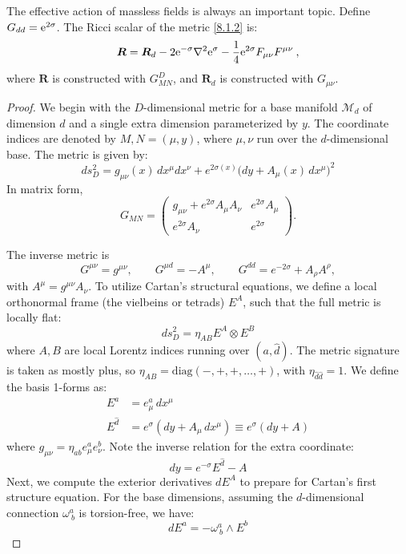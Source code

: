 The effective action of massless fields is always an important topic. Define $G_{d d}=\mathrm{e}^{2 \sigma}$. The Ricci scalar of the metric \eqref{8.1.2} is:
\begin{equation}
	\bm{R}=\bm{R}_{d}-2 \mathrm{e}^{-\sigma} \nabla^{2} \mathrm{e}^{\sigma}-\frac{1}{4} \mathrm{e}^{2 \sigma} F_{\mu \nu} F^{\mu \nu} \:, \label{8.1.8}
\end{equation}
where $\bm{R}$ is constructed with $G_{M N}^{D}$, and $\bm{R}_{d}$ is constructed with $G_{\mu \nu} $.
\begin{tcolorbox}[breakable]
	\begin{proof}
			We begin with the $D$-dimensional metric for a base manifold $\mathcal{M}_d$ of dimension $d$ and a single extra dimension parameterized by $y$. The coordinate indices are denoted by $M, N = (\mu, y)$, where $\mu, \nu$ run over the $d$-dimensional base. The metric is given by:
			\begin{equation}
				ds_D^2 = g_{\mu\nu}(x) \, dx^\mu dx^\nu + e^{2\sigma(x)} \big( dy + A_\mu(x) \, dx^\mu \big)^2
			\end{equation}
			In matrix form,
			\[
			G_{MN} = \begin{pmatrix}
				g_{\mu\nu} + e^{2\sigma} A_\mu A_\nu & e^{2\sigma} A_\mu \\
				e^{2\sigma} A_\nu & e^{2\sigma}
			\end{pmatrix}.
			\]
			
			The inverse metric is
			\[
			G^{\mu\nu} = g^{\mu\nu}, \qquad
			G^{\mu d} = -A^\mu, \qquad
			G^{dd} = e^{-2\sigma} + A_\rho A^\rho,
			\]
			with $A^\mu = g^{\mu\nu} A_\nu$. To utilize Cartan's structural equations, we define a local orthonormal frame (the vielbeins or tetrads) $E^A$, such that the full metric is locally flat:
			\begin{equation}
				ds_D^2 = \eta_{AB} E^A \otimes E^B
			\end{equation}
			where $A, B$ are local Lorentz indices running over $(a, \hat{d})$. The metric signature is taken as mostly plus, so $\eta_{AB} = \text{diag}(-, +, +, \dots, +)$, with $\eta_{\hat{d}\hat{d}} = 1$. We define the basis 1-forms as:
			\begin{align}
				E^a &= e^a_\mu \, dx^\mu \label{eq:Ea} \\
				E^{\hat{d}} &= e^\sigma (dy + A_\mu \, dx^\mu) \equiv e^\sigma (dy + A) \label{eq:Ed}
			\end{align}
			where $g_{\mu\nu} = \eta_{ab} e^a_\mu e^b_\nu$. Note the inverse relation for the extra coordinate:
			\begin{equation}
				dy = e^{-\sigma} E^{\hat{d}} - A
			\end{equation}			
			Next, we compute the exterior derivatives $dE^A$ to prepare for Cartan's first structure equation. For the base dimensions, assuming the $d$-dimensional connection $\omega^a_{\ b}$ is torsion-free, we have:
			\begin{equation}
				dE^a = -\omega^a_{\ b} \wedge E^b
			\end{equation}
			

\end{proof}
\end{tcolorbox}
